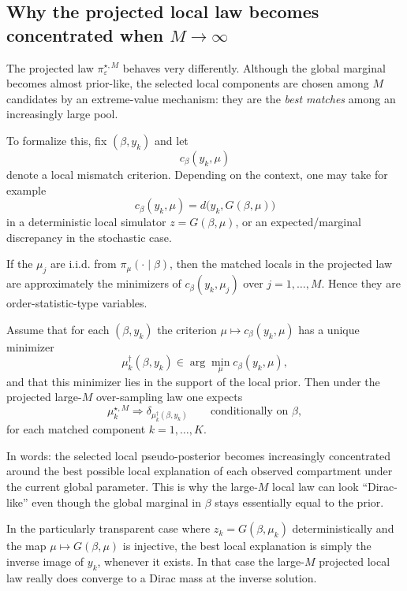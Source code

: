 \subsection{Why the projected local law becomes concentrated when $M \to \infty$}

The projected law $\pi^{\star,M}_{\varepsilon}$ behaves very differently. Although the global marginal
becomes almost prior-like, the selected local components are chosen among $M$ candidates by an
extreme-value mechanism: they are the \emph{best matches} among an increasingly large pool.

To formalize this, fix $(\beta,y_k)$ and let
\[
  c_\beta(y_k,\mu)
\]
denote a local mismatch criterion. Depending on the context, one may take for example
\[
  c_\beta(y_k,\mu) = d\bigl(y_k,G(\beta,\mu)\bigr)
\]
in a deterministic local simulator $z=G(\beta,\mu)$, or an expected/marginal discrepancy in the
stochastic case.

If the $\mu_j$ are i.i.d. from $\pi_\mu(\cdot\mid \beta)$, then the matched locals in the projected
law are approximately the minimizers of $c_\beta(y_k,\mu_j)$ over $j=1,\dots,M$. Hence they are
order-statistic-type variables.

\begin{proposition}
Assume that for each $(\beta,y_k)$ the criterion $\mu \mapsto c_\beta(y_k,\mu)$ has a unique
minimizer
\[
  \mu_k^{\dagger}(\beta,y_k)
  \in \arg\min_\mu c_\beta(y_k,\mu),
\]
and that this minimizer lies in the support of the local prior. Then under the projected
large-$M$ over-sampling law one expects
\[
  \mu_k^{\star,M} \Longrightarrow \delta_{\mu_k^{\dagger}(\beta,y_k)}
\qquad \text{conditionally on } \beta,
\]
for each matched component $k=1,\dots,K$.
\end{proposition}

In words: the selected local pseudo-posterior becomes increasingly concentrated around the best
possible local explanation of each observed compartment under the current global parameter.
This is why the large-$M$ local law can look ``Dirac-like'' even though the global marginal in
$\beta$ stays essentially equal to the prior.

\begin{remark}
In the particularly transparent case where $z_k = G(\beta,\mu_k)$ deterministically and the map
$\mu \mapsto G(\beta,\mu)$ is injective, the best local explanation is simply the inverse image of
$y_k$, whenever it exists. In that case the large-$M$ projected local law really does converge to a
Dirac mass at the inverse solution.
\end{remark}

